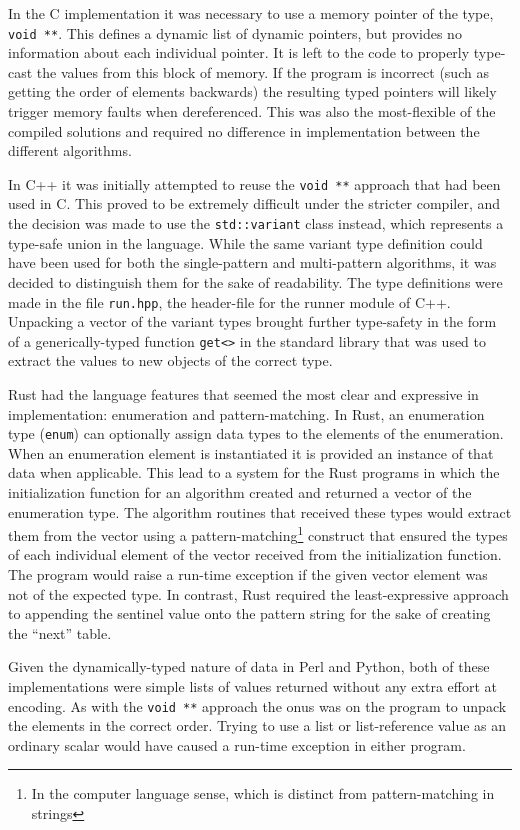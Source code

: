 In the C implementation it was necessary to use a memory pointer of the type, \texttt{void **}. This defines a dynamic list of dynamic pointers, but provides no information about each individual pointer. It is left to the code to properly type-cast the values from this block of memory. If the program is incorrect (such as getting the order of elements backwards) the resulting typed pointers will likely trigger memory faults when dereferenced. This was also the most-flexible of the compiled solutions and required no difference in implementation between the different algorithms.

In C++ it was initially attempted to reuse the \texttt{void **} approach that had been used in C. This proved to be extremely difficult under the stricter compiler, and the decision was made to use the \texttt{std::variant} class instead, which represents a type-safe union in the language. While the same variant type definition could have been used for both the single-pattern and multi-pattern algorithms, it was decided to distinguish them for the sake of readability. The type definitions were made in the file \texttt{run.hpp}, the header-file for the runner module of C++. Unpacking a vector of the variant types brought further type-safety in the form of a generically-typed function \texttt{get<>} in the standard library that was used to extract the values to new objects of the correct type.

Rust had the language features that seemed the most clear and expressive in implementation: enumeration and pattern-matching. In Rust, an enumeration type (\texttt{enum}) can optionally assign data types to the elements of the enumeration. When an enumeration element is instantiated it is provided an instance of that data when applicable. This lead to a system for the Rust programs in which the initialization function for an algorithm created and returned a vector of the enumeration type. The algorithm routines that received these types would extract them from the vector using a pattern-matching\footnote{In the computer language sense, which is distinct from pattern-matching in strings} construct that ensured the types of each individual element of the vector received from the initialization function. The program would raise a run-time exception if the given vector element was not of the expected type. In contrast, Rust required the least-expressive approach to appending the sentinel value onto the pattern string for the sake of creating the ``next'' table.

Given the dynamically-typed nature of data in Perl and Python, both of these implementations were simple lists of values returned without any extra effort at encoding. As with the \texttt{void **} approach the onus was on the program to unpack the elements in the correct order. Trying to use a list or list-reference value as an ordinary scalar would have caused a run-time exception in either program.

